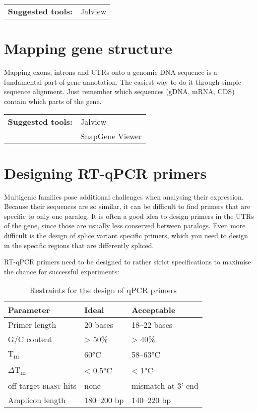 \documentclass[11pt]{article}
\begin{document}
	\vspace*{\baselineskip}
	
	\noindent\begin{tabular}{@{}ll}
		\textbf{Suggested tools:}	& Jalview \\
	\end{tabular} 
	
	\section{Mapping gene structure\label{sec:str}}
	
	Mapping exons, introns and UTRs onto a genomic DNA sequence is a fundamental part of gene annotation. The easiest way to do it through simple sequence alignment. Just remember which sequences (gDNA, mRNA, CDS) contain which parts of the gene.
	
	\vspace*{\baselineskip}
	
	\noindent\begin{tabular}{@{}ll}
		\textbf{Suggested tools:} & Jalview \\
		& SnapGene Viewer
	\end{tabular} 
	
	\section{Designing RT-qPCR primers\label{sec:qpcr}}
	
	Multigenic families pose additional challenges when analysing their expression. Because their sequences are so similar, it can be difficult to find primers that are specific to only one paralog. It is often a good idea to design primers in the UTRs of the gene, since those are usually less conserved between paralogs. Even more difficult is the design of splice variant specific primers, which you need to design in the specific regions that are differently spliced.
	
	RT-qPCR primers need to be designed to rather strict specifications to maximise the chance for successful experiments:
\begin{table}[h!]
		\caption{Restraints for the design of qPCR primers}
		\centering
	\begin{tabular}{@{}lll}
		\toprule
		Parameter & Ideal & Acceptable \\
		\midrule
		Primer length & 20 bases & 18--22 bases \\
		G/C content & > 50\% & > 40\% \\
		T\textsubscript{m}& 60°C & 58--63°C \\
		$\Delta$T\textsubscript{m} & < 0.5°C & < 1°C \\
		off-target \textsc{blast} hits & none & mismatch at 3'-end \\
		Amplicon length & 180--200 bp & 140--220 bp \\
		\bottomrule
	\end{tabular}
\end{table}
\end{document}
